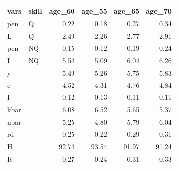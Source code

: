\begin{tabular}{llrrrr}
  \hline
vars & skill & age\_60 & age\_55 & age\_65 & age\_70 \\ 
  \hline
pen & Q & 0.22 & 0.18 & 0.27 & 0.34 \\ 
  L & Q & 2.49 & 2.26 & 2.77 & 2.91 \\ 
  pen & NQ & 0.15 & 0.12 & 0.19 & 0.24 \\ 
  L & NQ & 5.54 & 5.09 & 6.04 & 6.26 \\ 
  y &  & 5.49 & 5.26 & 5.75 & 5.83 \\ 
  c &  & 4.52 & 4.31 & 4.76 & 4.84 \\ 
  I &  & 0.12 & 0.13 & 0.11 & 0.11 \\ 
  kbar &  & 6.08 & 6.52 & 5.65 & 5.37 \\ 
  nbar &  & 5.25 & 4.80 & 5.79 & 6.04 \\ 
  rd &  & 0.25 & 0.22 & 0.29 & 0.31 \\ 
  H &  & 92.74 & 93.54 & 91.97 & 91.24 \\ 
  R &  & 0.27 & 0.24 & 0.31 & 0.33 \\ 
   \hline
\end{tabular}

